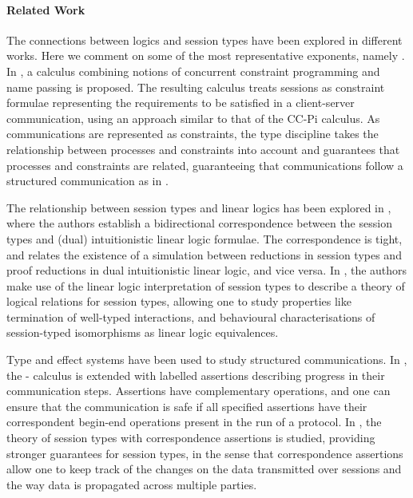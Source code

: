 \paragraph{Related Work}
The connections between logics and session types have been explored in
different works. Here we comment on some of the most representative
exponents, namely \cite{CD08, caires2010session,
  Bocchi2010A-theory-of-des,gordon2009principles,Berger2008Completeness-an}.
In \cite{CD08}, a calculus combining notions of concurrent constraint
programming and name passing is proposed. The resulting calculus
treats sessions as constraint formulae representing the requirements
to be satisfied in a client-server communication, using an approach similar to that of the CC-Pi calculus. As communications are
represented as constraints, the type discipline takes the relationship
between processes and constraints into account and guarantees that 
processes and constraints are related, guaranteeing that
communications follow a structured communication as in
\cite{honda1998lpa}.

The relationship between session types and linear logics has been
explored in \cite{caires2010session}, where the authors establish a
bidirectional correspondence between the session types and (dual)
intuitionistic linear logic formulae. The correspondence is tight, and
relates the existence of a simulation between reductions in session
types and proof reductions in dual intuitionistic
linear logic, and vice versa.  In \cite{Perez2012Linear-Logical-}, the
authors make use of the linear logic interpretation of session types
to describe a theory of logical relations for session types, allowing
one to study properties like termination of well-typed interactions,
and behavioural characterisations of session-typed isomorphisms as
linear logic equivalences.

Type and effect systems have been used to study structured
communications. In \cite{gordon2003typing}, the \mipi- calculus is
extended with labelled assertions describing progress in their
communication steps. Assertions have complementary operations, and one
can ensure that the communication is safe if all specified assertions
have their correspondent begin-end operations present in the run of a
protocol. In \cite{bonelli2005correspondence}, the theory of session
types with correspondence assertions is studied, providing stronger
guarantees for session types, in the sense that correspondence
assertions allow one to keep track of the changes on the data
transmitted over sessions and the way data is propagated across
multiple parties.


